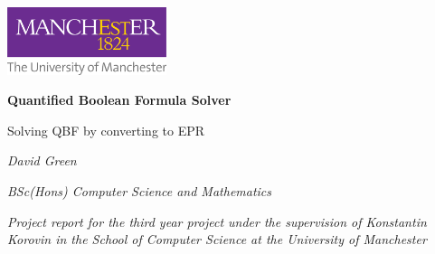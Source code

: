 \begin{titlepage}
\centering
\includegraphics[width=0.35\textwidth]{UniOfManchesterLogo}
\par
\vspace{1cm}
{\huge\bfseries Quantified Boolean Formula Solver\par}
\vspace{1cm}
{\Large Solving QBF by converting to EPR\par}
\vspace{2cm}
{\textit{David Green}\par}
{\textit{BSc(Hons) Computer Science and Mathematics}\par}
{\textit{Project report for the third year project under the supervision of Konstantin Korovin in the School of Computer Science at the University of Manchester}\par}
\vfill
{\large \monthyear{} \par}
\end{titlepage}
